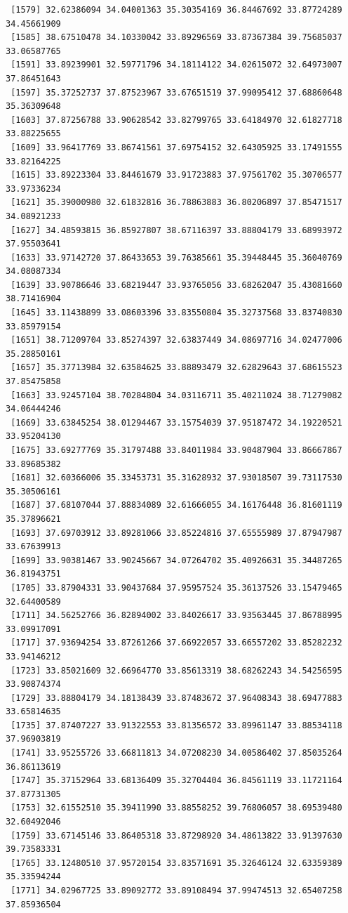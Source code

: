 \documentclass[
  letterpaper,
  DIV=11,
  numbers=noendperiod]{scrartcl}
\begin{document}
\begin{verbatim}
 [1579] 32.62386094 34.04001363 35.30354169 36.84467692 33.87724289 34.45661909
 [1585] 38.67510478 34.10330042 33.89296569 33.87367384 39.75685037 33.06587765
 [1591] 33.89239901 32.59771796 34.18114122 34.02615072 32.64973007 37.86451643
 [1597] 35.37252737 37.87523967 33.67651519 37.99095412 37.68860648 35.36309648
 [1603] 37.87256788 33.90628542 33.82799765 33.64184970 32.61827718 33.88225655
 [1609] 33.96417769 33.86741561 37.69754152 32.64305925 33.17491555 33.82164225
 [1615] 33.89223304 33.84461679 33.91723883 37.97561702 35.30706577 33.97336234
 [1621] 35.39000980 32.61832816 36.78863883 36.80206897 37.85471517 34.08921233
 [1627] 34.48593815 36.85927807 38.67116397 33.88804179 33.68993972 37.95503641
 [1633] 33.97142720 37.86433653 39.76385661 35.39448445 35.36040769 34.08087334
 [1639] 33.90786646 33.68219447 33.93765056 33.68262047 35.43081660 38.71416904
 [1645] 33.11438899 33.08603396 33.83550804 35.32737568 33.83740830 33.85979154
 [1651] 38.71209704 33.85274397 32.63837449 34.08697716 34.02477006 35.28850161
 [1657] 35.37713984 32.63584625 33.88893479 32.62829643 37.68615523 37.85475858
 [1663] 33.92457104 38.70284804 34.03116711 35.40211024 38.71279082 34.06444246
 [1669] 33.63845254 38.01294467 33.15754039 37.95187472 34.19220521 33.95204130
 [1675] 33.69277769 35.31797488 33.84011984 33.90487904 33.86667867 33.89685382
 [1681] 32.60366006 35.33453731 35.31628932 37.93018507 39.73117530 35.30506161
 [1687] 37.68107044 37.88834089 32.61666055 34.16176448 36.81601119 35.37896621
 [1693] 37.69703912 33.89281066 33.85224816 37.65555989 37.87947987 33.67639913
 [1699] 33.90381467 33.90245667 34.07264702 35.40926631 35.34487265 36.81943751
 [1705] 33.87904331 33.90437684 37.95957524 35.36137526 33.15479465 32.64400589
 [1711] 34.56252766 36.82894002 33.84026617 33.93563445 37.86788995 33.09917091
 [1717] 37.93694254 33.87261266 37.66922057 33.66557202 33.85282232 33.94146212
 [1723] 33.85021609 32.66964770 33.85613319 38.68262243 34.54256595 33.90874374
 [1729] 33.88804179 34.18138439 33.87483672 37.96408343 38.69477883 33.65814635
 [1735] 37.87407227 33.91322553 33.81356572 33.89961147 33.88534118 37.96903819
 [1741] 33.95255726 33.66811813 34.07208230 34.00586402 37.85035264 36.86113619
 [1747] 35.37152964 33.68136409 35.32704404 36.84561119 33.11721164 37.87731305
 [1753] 32.61552510 35.39411990 33.88558252 39.76806057 38.69539480 32.60492046
 [1759] 33.67145146 33.86405318 33.87298920 34.48613822 33.91397630 39.73583331
 [1765] 33.12480510 37.95720154 33.83571691 35.32646124 32.63359389 35.33594244
 [1771] 34.02967725 33.89092772 33.89108494 37.99474513 32.65407258 37.85936504

\end{verbatim}
\end{document}
